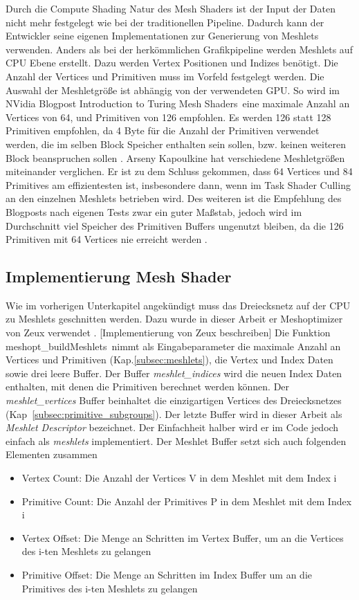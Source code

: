 Durch die Compute Shading Natur des Mesh Shaders ist der Input der Daten nicht mehr festgelegt wie bei der traditionellen Pipeline.
Dadurch kann der Entwickler seine eigenen Implementationen zur Generierung von Meshlets verwenden.
Anders als bei der herkömmlichen Grafikpipeline werden Meshlets auf CPU Ebene erstellt.
Dazu werden Vertex Positionen und Indizes benötigt.
Die Anzahl der Vertices und Primitiven muss im Vorfeld festgelegt werden.
Die Auswahl der Meshletgröße ist abhängig von der verwendeten GPU.
So wird im NVidia Blogpost \glqq Introduction to Turing Mesh Shaders\grqq\ eine maximale Anzahl an Vertices von 64, und Primitiven von 126 empfohlen. 
Es werden 126 statt 128 Primitiven empfohlen, da 4 Byte für die Anzahl der Primitiven verwendet werden, die im selben Block Speicher enthalten sein sollen, bzw. keinen weiteren Block beanspruchen sollen \cite{Kubisch2018}.
Arseny Kapoulkine hat verschiedene Meshletgrößen miteinander verglichen.
Er ist zu dem Schluss gekommen, dass 64 Vertices und 84 Primitives am effizientesten ist, insbesondere dann, wenn im Task Shader Culling an den einzelnen Meshlets betrieben wird.
Des weiteren ist die Empfehlung des Blogposts nach eigenen Tests zwar ein guter Maßstab, jedoch wird im Durchschnitt viel Speicher des Primitiven Buffers ungenutzt bleiben, da die 126 Primitiven mit 64 Vertices nie erreicht werden \cite{Kapoulkine2023}.

\subsection{Implementierung Mesh Shader}
\label{subsec:meshshaderimpl}
Wie im vorherigen Unterkapitel angekündigt muss das Dreiecksnetz auf der CPU zu Meshlets geschnitten werden. 
Dazu wurde in dieser Arbeit er Meshoptimizer von Zeux verwendet \cite{Zeux}. 
[Implementierung von Zeux beschreiben]
Die Funktion \glqq meshopt\_buildMeshlets\grqq\ nimmt als Eingabeparameter die maximale Anzahl an Vertices und Primitiven (Kap.\ref{subsec:meshlets}), die Vertex und Index Daten sowie drei leere Buffer.
Der Buffer \textit{meshlet\_indices} wird die neuen Index Daten enthalten, mit denen die Primitiven berechnet werden können.
Der \textit{meshlet\_vertices} Buffer beinhaltet die einzigartigen Vertices des Dreiecksnetzes (Kap~\ref{subsec:primitive_subgroups}).
Der letzte Buffer wird in dieser Arbeit als \textit{Meshlet Descriptor} bezeichnet.
Der Einfachheit halber wird er im Code jedoch einfach als \textit{meshlets} implementiert.
Der Meshlet Buffer setzt sich auch folgenden Elementen zusammen
\begin{itemize}
\item Vertex Count: Die Anzahl der Vertices V in dem Meshlet mit dem Index i
\item Primitive Count: Die Anzahl der Primitives P in dem Meshlet mit dem Index i
\item Vertex Offset: Die Menge an Schritten im Vertex Buffer, um an die Vertices des i-ten Meshlets zu gelangen
\item Primitive Offset: Die Menge an Schritten im Index Buffer um an die Primitives des i-ten Meshlets zu gelangen
\end{itemize}


